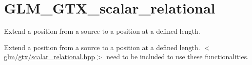 \hypertarget{group__gtx__scalar__relational}{\section{G\-L\-M\-\_\-\-G\-T\-X\-\_\-scalar\-\_\-relational}
\label{group__gtx__scalar__relational}
}


Extend a position from a source to a position at a defined length.  


Extend a position from a source to a position at a defined length. $<$\hyperlink{scalar__relational_8hpp}{glm/gtx/scalar\-\_\-relational.\-hpp}$>$ need to be included to use these functionalities. 